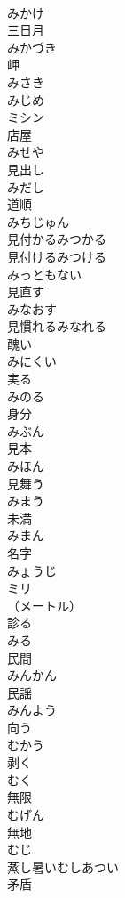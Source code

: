 \documentclass[8pt]{extreport}
\begin{document}
\begin{CJK}{UTF8}{min}
\\	みかけ	
\\	三日月 
\\	みかづき	
\\	岬 
\\	みさき	
\\	みじめ	
\\	ミシン	
\\	店屋 
\\	みせや	
\\	見出し 
\\	みだし	
\\	道順 
\\	みちじゅん	
\\	見付かるみつかる	
\\	見付けるみつける	
\\	みっともない	
\\	見直す 
\\	みなおす	
\\	見慣れるみなれる	
\\	醜い 
\\	みにくい	
\\	実る 
\\	みのる	
\\	身分 
\\	みぶん	
\\	見本 
\\	みほん	
\\	見舞う 
\\	みまう	
\\	未満 
\\	みまん	
\\	名字 
\\	みょうじ	
\\	ミリ 
\\	（メートル）	
\\	診る 
\\	みる	
\\	民間 
\\	みんかん	
\\	民謡 
\\	みんよう	
\\	向う 
\\	むかう	
\\	剥く 
\\	むく	
\\	無限 
\\	むげん	
\\	無地 
\\	むじ	
\\	蒸し暑いむしあつい	
\\	矛盾 

\end{CJK}
\end{document}
